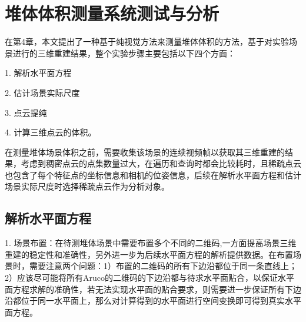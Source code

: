 \section{堆体体积测量系统测试与分析}
\label{sec:5.4}
在第4章，本文提出了一种基于纯视觉方法来测量堆体体积的方法，基于对实验场景进行的三维重建结果，整个实验步骤主要包括以下四个方面：

1. 解析水平面方程

2. 估计场景实际尺度

3. 点云提纯

4. 计算三维点云的体积。

在测量堆体场景体积之前，需要收集该场景的连续视频帧以获取其三维重建的结果，考虑到稠密点云的点集数量过大，在遍历和查询时都会比较耗时，且稀疏点云也包含了每个特征点的坐标信息和相机的位姿信息，后续在解析水平面方程和估计场景实际尺度时选择稀疏点云作为分析对象。

\subsection{解析水平面方程}
\label{sec:5.4.1}
1. 场景布置：在待测堆体场景中需要布置多个不同的二维码,一方面提高场景三维重建的稳定性和准确性，另外进一步为后续水平面方程的解析提供数据。在布置场景时，需要注意两个问题：1）布置的二维码的所有下边沿都位于同一条直线上；2）应该尽可能将所有Aruco的二维码的下边沿都与待求水平面贴合，以保证水平面方程求解的准确性，若无法实现水平面的贴合要求，则需要进一步保证所有下边沿都位于同一水平面上，那么对计算得到的水平面进行空间变换即可得到真实水平面方程。

